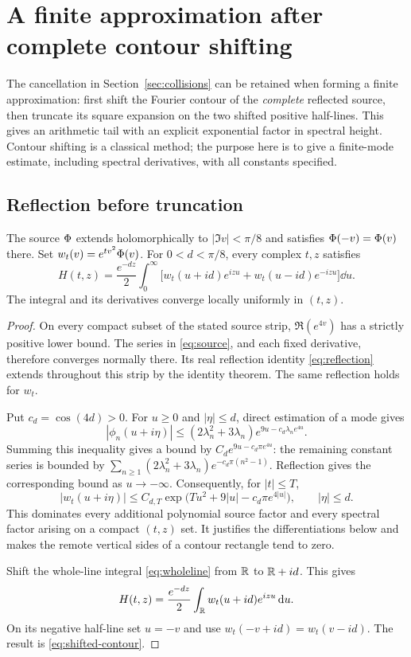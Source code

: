 \section{A finite approximation after complete contour shifting}\label{sec:shifted}

The cancellation in Section~\ref{sec:collisions} can be retained when
forming a finite approximation: first shift the Fourier contour of the
\emph{complete} reflected source, then truncate its square expansion on
the two shifted positive half-lines. This gives an arithmetic tail with
an explicit exponential factor in spectral height. Contour shifting is a
classical method; the purpose here is to give a finite-mode estimate,
including spectral derivatives, with all constants specified.

\subsection{Reflection before truncation}

\begin{lemma}\label{lem:shifted-contour}
The source $\Phi$ extends holomorphically to $|\Im v|<\pi/8$ and satisfies
$\Phi(-v)=\Phi(v)$ there. Set $w_t(v)=e^{tv^2}\Phi(v)$. For
$0<d<\pi/8$, every complex $t,z$ satisfies
\begin{equation}\label{eq:shifted-contour}
 H(t,z)=\frac{e^{-dz}}2\int_0^\infty
 \bigl[w_t(u+id)e^{izu}+w_t(u-id)e^{-izu}\bigr]\dd u.
\end{equation}
The integral and its derivatives converge locally uniformly in $(t,z)$.
\end{lemma}
\begin{proof}
On every compact subset of the stated source strip, $\Re(e^{4v})$ has a
strictly positive lower bound. The series in \eqref{eq:source}, and each
fixed derivative, therefore converges normally there. Its real reflection
identity \eqref{eq:reflection} extends throughout this strip by the
identity theorem. The same reflection holds for $w_t$.

Put $c_d=\cos(4d)>0$. For $u\ge0$ and $|\eta|\le d$, direct estimation
of a mode gives
\[
 |\phi_n(u+i\eta)|
 \le(2\lambda_n^2+3\lambda_n)e^{9u-c_d\lambda_ne^{4u}}.
\]
Summing this inequality gives a bound by
$C_d e^{9u-c_d\pi e^{4u}}$: the remaining constant series is bounded by
$\sum_{n\ge1}(2\lambda_n^2+3\lambda_n)e^{-c_d\pi(n^2-1)}$.
Reflection gives the corresponding bound as $u\to-\infty$.
Consequently, for $|t|\le T$,
\[
 |w_t(u+i\eta)|
 \le C_{d,T}\exp\bigl(Tu^2+9|u|-c_d\pi e^{4|u|}\bigr),
 \qquad |\eta|\le d.
\]
This dominates every additional polynomial source factor and every
spectral factor arising on a compact $(t,z)$ set. It justifies the
differentiations below and makes the remote vertical sides of a contour
rectangle tend to zero.

Shift the whole-line integral \eqref{eq:wholeline} from $\mathbb R$ to
$\mathbb R+id$. This gives
\[
 H(t,z)=\frac{e^{-dz}}2\int_\mathbb R w_t(u+id)e^{izu}\,\mathrm d u.
\]
On its negative half-line set $u=-v$ and use
$w_t(-v+id)=w_t(v-id)$. The result is
\eqref{eq:shifted-contour}.
\end{proof}

